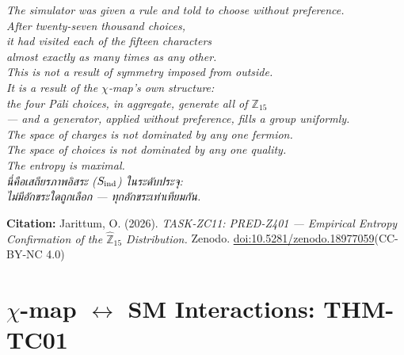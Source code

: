 \documentclass[12pt, a4paper]{article}
\begin{document}
\bigskip
\begin{center}
\textit{
  The simulator was given a rule and told to choose without preference.\\
  After twenty-seven thousand choices,\\
  it had visited each of the fifteen characters\\
  almost exactly as many times as any other.\\[0.5em]
  This is not a result of symmetry imposed from outside.\\
  It is a result of the $\chi$-map's own structure:\\
  the four Pāli choices, in aggregate, generate all of $\mathbb{Z}_{15}$\\
  — and a generator, applied without preference, fills a group uniformly.\\[0.5em]
  The space of charges is not dominated by any one fermion.\\
  The space of choices is not dominated by any one quality.\\
  The entropy is maximal.\\
  \textthai{นี่คือเสถียรภาพอิสระ ($S_{\rm ind}$) ในระดับประจุ:}\\
  \textthai{ไม่มีอักขระใดถูกเลือก — ทุกอักขระเท่าเทียมกัน.}
}
\end{center}

\medskip
\begin{center}
\textbf{Citation:} Jarittum, O. (2026).
\textit{TASK-ZC11: PRED-Z401 --- Empirical Entropy Confirmation of the
$\hat{\mathbb{Z}}_{15}$ Distribution.}
Zenodo. \href{https://doi.org/10.5281/zenodo.18977059}%
{doi:10.5281/zenodo.18977059}\quad (CC-BY-NC 4.0)
\end{center}

\bigskip


\section{$\chi$-map $\leftrightarrow$ SM Interactions: THM-TC01}
\label{sec:thm-tc01}

\end{document}
